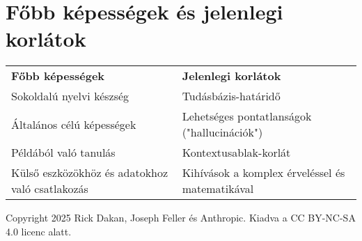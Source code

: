 \documentclass[a4paper, 12pt]{article}
\begin{document}
\section*{Főbb képességek és jelenlegi korlátok}
\begin{tabular}{p{} p{}}
\textbf{Főbb képességek} & \textbf{Jelenlegi korlátok} \\
Sokoldalú nyelvi készség & Tudásbázis-határidő \\
Általános célú képességek & Lehetséges pontatlanságok ("hallucinációk") \\
Példából való tanulás & Kontextusablak-korlát \\
\parbox[t]{0.45\textwidth}{Külső eszközökhöz és adatokhoz való csatlakozás} & \parbox[t]{0.45\textwidth}{Kihívások a komplex érveléssel és matematikával} \\
\end{tabular}

\vspace{\fill}
\begin{center}
    \small{Copyright 2025 Rick Dakan, Joseph Feller és Anthropic. Kiadva a CC BY-NC-SA 4.0 licenc alatt.}
\end{center}
\end{document}
